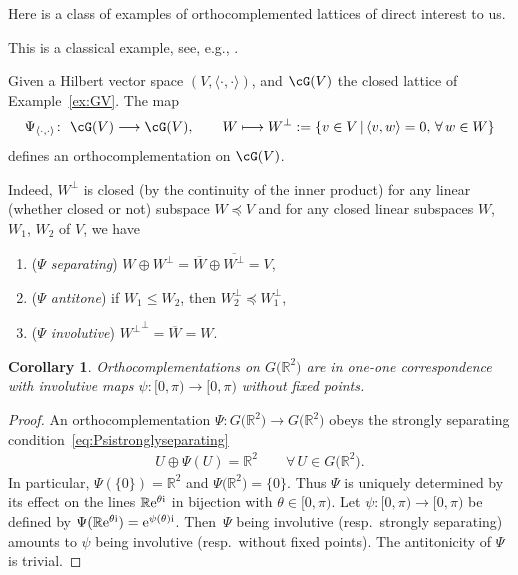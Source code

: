 \documentclass[10pt,a4paper]{amsart}
\numberwithin{equation}{section}
\newtheorem{Corollary}[Theorem]{Corollary}
\newcommand{\R}{\mathbb{R}}
\newcommand{\pone}{separating\xspace }
\begin{document}
Here is a class of examples of orthocomplemented lattices of direct interest to us.
\begin{Example}%
This is a classical example, see, e.g., \cite[below Definition 1.4]{CM}.
	
	Given a Hilbert vector space $(V, \langle\cdot, \cdot\rangle)$,
	and $\cG(V)$ the closed \subsp lattice of Example~\ref{ex:GV}. The map
	\begin{gather*}%
	\Psi_{\langle\cdot, \cdot\rangle}\colon \ \cG(V) \longrightarrow \cG(V),\qquad
	W\longmapsto W^\perp:=\{v\in V\,|\, \langle v, w\rangle=0,\, \forall\, w\in W\}
	\end{gather*}
	defines an orthocomplementation on $\cG(V)$.
	
	Indeed, $W^\perp$ is closed (by the continuity of the inner product) for any linear (whether closed or not) subspace $W\preceq V$ and for any closed linear subspaces $W$, $W_1$, $W_2$ of $V$, we have
	\begin{enumerate}\itemsep=0pt
	\item[$(a)$] ({\it $\Psi$ \pone}) {$W\oplus W^\perp =\overline W\oplus \overline{W^\perp}=V$},
	\item[$(b)$] ({\it $\Psi$ antitone}) if $W_1\leq W_2$, then $W_2^\perp\preceq W_1^\perp$,
	\item[$(c)$]
		({\it $\Psi$ involutive}) ${W^\perp}^\perp=\overline W=W$.
	\end{enumerate}
\end{Example}
\begin{Corollary}\label{coro:PsiR2}
Orthocomplementations on $G\big(\R^2\big)$ are in one-one correspondence with involutive maps $\psi\colon [0, \pi)\to [0, \pi)$ without fixed points.
\end{Corollary}
\begin{proof}
An orthocomplementation $\Psi\colon G\big(\R^2\big)\rightarrow G\big(\R^2\big)$ obeys the strongly separating condition~\eqref{eq:Psistronglyseparating}
\begin{gather*}
U\oplus \Psi(U) =\R^2 \qquad \forall\, U\in G\big(\R^2\big).
\end{gather*}
	In particular, $\Psi (\{0\})=\R^2$ and $\Psi\big(\R^2\big)=\{0\}$. Thus $\Psi$ is uniquely determined by its effect on the lines $\R {\rm e}^{\theta {\rm i}}$ in bijection with $\theta\in [0,\pi)$. Let $\psi\colon [0,\pi)\to [0,\pi)$ be defined by $\Psi(\R {\rm e}^{\theta {\rm i}})={\rm e}^{\psi(\theta){\rm i}}$. Then~$\Psi$ being involutive (resp.~strongly separating) amounts to $\psi$ being involutive (resp.~without fixed points). The antitonicity of $\Psi$ is trivial.
\end{proof}
\end{document}
